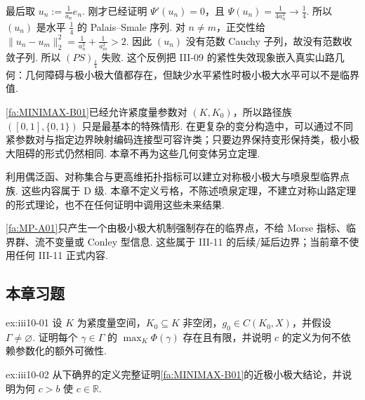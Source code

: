 最后取
\(\displaystyle u_n:=\frac{1}{a_n}e_n\).
刚才已经证明 \(\displaystyle\Psi'(u_n)=0\)，且
\(\displaystyle \Psi(u_n) = \frac{1}{4a_n^2} \longrightarrow \frac{1}{4}\).
所以 \(\displaystyle(u_n)\) 是水平 \(\displaystyle\frac{1}{4}\) 的 Palais--Smale 序列. 对 \(\displaystyle n\neq m\)，正交性给
\(\displaystyle \|u_n-u_m\|_2^2 = \frac{1}{a_n^2} + \frac{1}{a_m^2} > 2\).
因此 \(\displaystyle(u_n)\) 没有范数 Cauchy 子列，故没有范数收敛子列. 所以 \(\displaystyle(PS)_{\frac{1}{4}}\) 失败. 这个反例把 III-09 的紧性失效现象嵌入真实山路几何：几何障碍与极小极大值都存在，但缺少水平紧性时极小极大水平可以不是临界值.

\begin{FARemark}[紧参数对]
\autoref{fa:MINIMAX-B01}已经允许紧度量参数对 \(\displaystyle(K,K_0)\)，所以路径族 \(\displaystyle([0,1],\{0,1\})\) 只是最基本的特殊情形. 在更复杂的变分构造中，可以通过不同紧参数对与指定边界映射编码连接型可容许类；只要边界保持变形保持类，极小极大阻碍的形式仍然相同. 本章不再为这些几何变体另立定理.
\end{FARemark}

\begin{FARemark}
利用偶泛函、对称集合与更高维拓扑指标可以建立对称极小极大与喷泉型临界点族. 这些内容属于 D 级. 本章不定义亏格，不陈述喷泉定理，不建立对称山路定理的形式理论，也不在任何证明中调用这些未来结果.
\end{FARemark}

\begin{FARemark}[III-11 边界]
\autoref{fa:MP-A01}只产生一个由极小极大机制强制存在的临界点，不给 Morse 指标、临界群、流不变量或 Conley 型信息. 这些属于 III-11 的后续/延后边界；当前章不使用任何 III-11 正式内容.
\end{FARemark}

\subsection*{本章习题}\label{sec:iii10-exercises}

\begin{FAExercise}[紧参数对极小极大族]{ex:iii10-01}
设 \(\displaystyle K\) 为紧度量空间，\(\displaystyle K_0\subseteq K\) 非空闭，\(\displaystyle g_0\in C(K_0,X)\)，并假设 \(\displaystyle\Gamma\neq\varnothing\). 证明每个 \(\displaystyle\gamma\in\Gamma\) 的 \(\displaystyle\max_K\Phi(\gamma)\) 存在且有限，并说明 \(\displaystyle c\) 的定义为何不依赖参数化的额外可微性.
\end{FAExercise}

\begin{FAExercise}[近极小极大映射]{ex:iii10-02}
从下确界的定义完整证明\autoref{fa:MINIMAX-B01}的近极小极大结论，并说明为何 \(\displaystyle c>b\) 使 \(\displaystyle c\in\mathbb R\).
\end{FAExercise}

